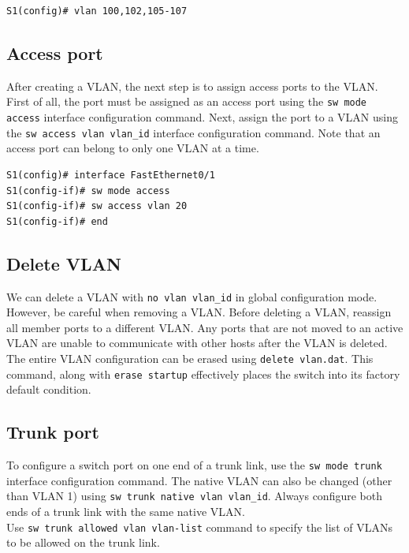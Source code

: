 \begin{verbatim}
S1(config)# vlan 100,102,105-107
\end{verbatim}

\subsection{Access port}

After creating a VLAN, the next step is to assign access ports to the VLAN. First of all, the port must be assigned as an
access port using the \verb|sw mode access| interface configuration command. Next, assign the port to a VLAN using the \verb|sw access vlan vlan_id| interface configuration command. Note that an access port can belong to only one VLAN at a time.

\begin{verbatim}
S1(config)# interface FastEthernet0/1
S1(config-if)# sw mode access
S1(config-if)# sw access vlan 20
S1(config-if)# end
\end{verbatim}

\subsection{Delete VLAN}

We can delete a VLAN with \verb|no vlan vlan_id| in global configuration mode. However, be careful when removing a VLAN. Before deleting a VLAN, reassign all member ports to a different VLAN. Any ports that are not moved to an active VLAN are unable to communicate with other hosts after the VLAN is deleted. \\

The entire VLAN configuration can be erased using \verb|delete vlan.dat|. This command, along with \verb|erase startup| effectively places the switch into its factory default condition.

\subsection{Trunk port}

To configure a switch port on one end of a trunk link, use the \verb|sw mode trunk| interface configuration command. The native VLAN can also be changed (other than VLAN 1) using \verb|sw trunk native vlan vlan_id|. Always configure both ends of a trunk link with the same native VLAN. \\

Use \verb|sw trunk allowed vlan vlan-list| command to specify the list of VLANs to be allowed on the trunk link.\\

